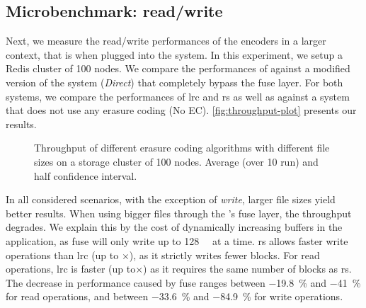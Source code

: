 \begin{table}
    \centering
    \caption{Encoding throughput of the different encoiders in \si{\mega\byte\per\second}}
    
    \label{table:codes-performance-table}
\end{table}

\subsection{Microbenchmark: read/write}
Next, we measure the read/write performances of the encoders in a larger context, that is when plugged into the \SYS system.
In this experiment, we setup a Redis cluster of 100 nodes.
We compare the performances of \SYS against a modified version of the system (\textit{Direct}) that completely bypass the \ac{fuse} layer.
For both systems, we compare the performances of \ac{lrc} and \ac{rs} as well as against a system that does not use any erasure coding (No EC).  
\autoref{fig:throughput-plot} presents our results.

\begin{figure*}[t]
    \centering
    
    \caption{Throughput of different erasure coding algorithms with different file sizes on a storage cluster of 100 nodes. Average (over 10 run) and half confidence interval.}
    \label{fig:throughput-plot}
\end{figure*}

In all considered scenarios, with the exception of \SYS \textit{write}, larger file sizes yield better results.
When using bigger files through the \SYS's \ac{fuse} layer, the throughput degrades.
We explain this by the cost of dynamically increasing buffers in the application, as \ac{fuse} will only write up to \SI{128}{\kibi\byte} at a time.
\ac{rs} allows faster write operations than \ac{lrc} (up to $\times$), as it strictly writes fewer blocks.
For read operations, \ac{lrc} is faster (up to$\times$) as it requires the same number of blocks as \ac{rs}.
The decrease in performance caused by \ac{fuse} ranges between \SI{-19.8}{\percent} and \SI{-41}{\percent} for read operations, and between \SI{-33.6}{\percent} and \SI{-84.9}{\percent} for write operations.



